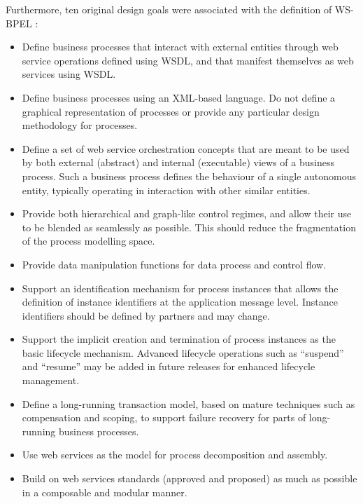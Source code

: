 Furthermore, ten original design goals were associated with the definition of WS-BPEL \cite{wsbpelstandard}:
\begin{itemize}
\item Define business processes that interact with external entities 
through web service operations defined using WSDL, and that 
manifest themselves as web services using WSDL. 
\item Define business processes using an XML-based language. 
Do not define a graphical representation of processes or provide any particular design methodology for processes.
\item Define a set of web service orchestration concepts that are meant to be used by both external (abstract) and internal (executable) views of a business process. Such a business process defines the behaviour of a single autonomous entity, typically operating in interaction with other similar entities. 
\item Provide both hierarchical and graph-like control regimes, and allow their use to be blended as seamlessly as possible. This should reduce the fragmentation of the process modelling space.
\item Provide data manipulation functions for data process and control flow.
\item Support an identification mechanism for process instances that allows the definition of instance identifiers at the application message level. Instance identifiers should be defined by partners and may change.
\item Support the implicit creation and termination of process instances as the basic lifecycle mechanism. Advanced lifecycle operations such as ``suspend'' and ``resume'' may be added in future releases for enhanced lifecycle management.
\item Define a long-running transaction model, based on mature techniques such as compensation and scoping, to support failure recovery for parts of long-running business processes.
\item Use web services as the model for process decomposition and assembly.
\item  Build on web services standards (approved and proposed) as much as possible in a composable and modular manner.
\end{itemize}

